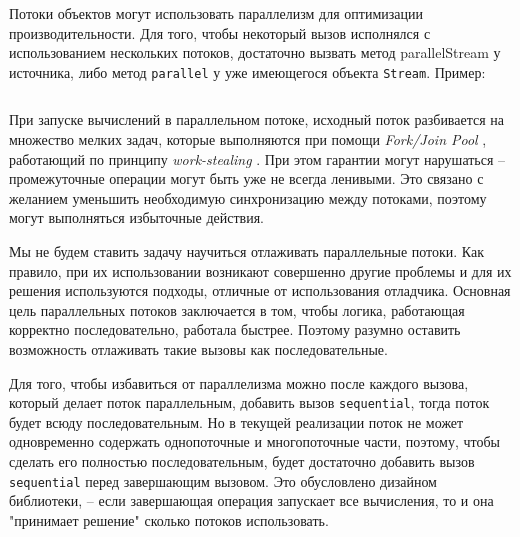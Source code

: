 Потоки объектов могут использовать параллелизм для оптимизации производительности. Для того, чтобы некоторый вызов исполнялся с использованием нескольких потоков, достаточно вызвать метод parallelStream у источника, либо метод \texttt{parallel} у уже имеющегося объекта \texttt{Stream}. Пример: 
\inputminted{java}{chapter2/code/ParallelStream.java}
При запуске вычислений в параллельном потоке, исходный поток разбивается на множество мелких задач, которые выполняются при помощи\textit{ Fork/Join Pool} \cite{java:forkjoin}, работающий по принципу \textit{work-stealing} \cite{wiki:worksteal}. При этом гарантии могут нарушаться -- промежуточные операции могут быть уже не всегда ленивыми. Это связано с желанием уменьшить необходимую синхронизацию между потоками, поэтому могут выполняться избыточные действия.

Мы не будем ставить задачу научиться отлаживать параллельные потоки. Как правило, при их использовании возникают совершенно другие проблемы и для их решения используются подходы, отличные от использования отладчика. Основная цель параллельных потоков заключается в том, чтобы логика, работающая корректно последовательно, работала быстрее. Поэтому разумно оставить возможность отлаживать такие вызовы как последовательные.

Для того, чтобы избавиться от параллелизма можно после каждого вызова, который делает поток параллельным, добавить вызов \texttt{sequential}, тогда поток будет всюду последовательным. Но в текущей реализации поток не может одновременно содержать однопоточные и многопоточные части, поэтому, чтобы сделать его полностью последовательным, будет достаточно добавить вызов \texttt{sequential} перед завершающим вызовом. Это обусловлено дизайном библиотеки, -- если завершающая операция запускает все вычисления, то и она "принимает решение" сколько потоков использовать.
